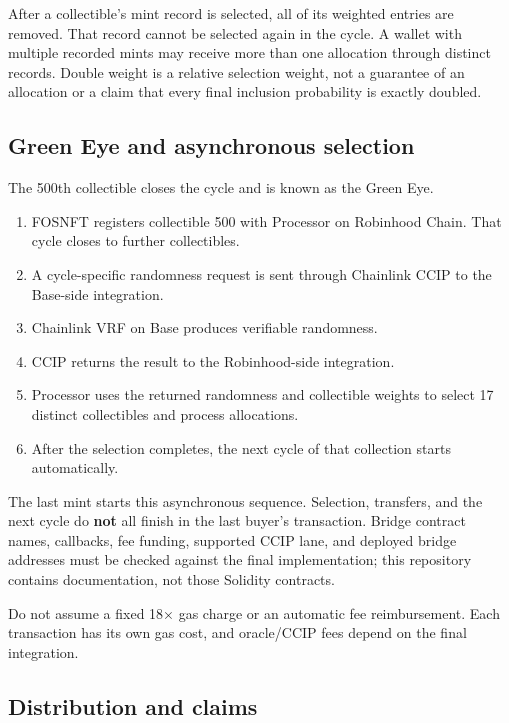 \documentclass[
  10pt,
  letterpaper,
]{article}
\providecommand{\tightlist}{%
  \setlength{\itemsep}{0pt}\setlength{\parskip}{0pt}}
\begin{document}
After a collectible's mint record is selected, all of its weighted
entries are removed. That record cannot be selected again in the cycle.
A wallet with multiple recorded mints may receive more than one
allocation through distinct records. Double weight is a relative
selection weight, not a guarantee of an allocation or a claim that every
final inclusion probability is exactly doubled.

\subsection{Green Eye and asynchronous
selection}\label{green-eye-and-asynchronous-selection}

The 500th collectible closes the cycle and is known as the Green Eye.

\begin{enumerate}
\def\labelenumi{\arabic{enumi}.}
\tightlist
\item
  FOSNFT registers collectible 500 with Processor on Robinhood Chain.
  That cycle closes to further collectibles.
\item
  A cycle-specific randomness request is sent through Chainlink CCIP to
  the Base-side integration.
\item
  Chainlink VRF on Base produces verifiable randomness.
\item
  CCIP returns the result to the Robinhood-side integration.
\item
  Processor uses the returned randomness and collectible weights to
  select 17 distinct collectibles and process allocations.
\item
  After the selection completes, the next cycle of that collection
  starts automatically.
\end{enumerate}

The last mint starts this asynchronous sequence. Selection, transfers,
and the next cycle do \textbf{not} all finish in the last buyer's
transaction. Bridge contract names, callbacks, fee funding, supported
CCIP lane, and deployed bridge addresses must be checked against the
final implementation; this repository contains documentation, not those
Solidity contracts.

Do not assume a fixed 18× gas charge or an automatic fee reimbursement.
Each transaction has its own gas cost, and oracle/CCIP fees depend on
the final integration.

\subsection{Distribution and claims}\label{distribution-and-claims}
\end{document}
